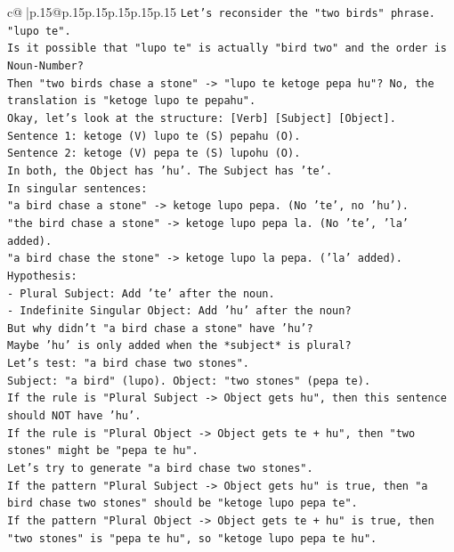\documentclass{article}
\begin{document}
{\begin{supertabular}{c@{$\;$}|p{.15\linewidth}@{}p{.15\linewidth}p{.15\linewidth}p{.15\linewidth}p{.15\linewidth}p{.15\linewidth}}
{{{\texttt{Let's reconsider the "two birds" phrase. "lupo te".} \\
\texttt{Is it possible that "lupo te" is actually "bird two" and the order is Noun{-}Number?} \\
\texttt{Then "two birds chase a stone" {-}> "lupo te ketoge pepa hu"? No, the translation is "ketoge lupo te pepahu".} \\
\texttt{Okay, let's look at the structure: {[}Verb{]} {[}Subject{]} {[}Object{]}.} \\
\texttt{Sentence 1: ketoge (V) lupo te (S) pepahu (O).} \\
\texttt{Sentence 2: ketoge (V) pepa te (S) lupohu (O).} \\
\texttt{In both, the Object has 'hu'. The Subject has 'te'.} \\
\texttt{In singular sentences:} \\
\texttt{"a bird chase a stone" {-}> ketoge lupo pepa. (No 'te', no 'hu').} \\
\texttt{"the bird chase a stone" {-}> ketoge lupo pepa la. (No 'te', 'la' added).} \\
\texttt{"a bird chase the stone" {-}> ketoge lupo la pepa. ('la' added).} \\
\texttt{Hypothesis:} \\
\texttt{{-} Plural Subject: Add 'te' after the noun.} \\
\texttt{{-} Indefinite Singular Object: Add 'hu' after the noun?} \\
\texttt{But why didn't "a bird chase a stone" have 'hu'?} \\
\texttt{Maybe 'hu' is only added when the *subject* is plural?} \\
\texttt{Let's test: "a bird chase two stones".} \\
\texttt{Subject: "a bird" (lupo). Object: "two stones" (pepa te).} \\
\texttt{If the rule is "Plural Subject {-}> Object gets hu", then this sentence should NOT have 'hu'.} \\
\texttt{If the rule is "Plural Object {-}> Object gets te + hu", then "two stones" might be "pepa te hu".} \\
\texttt{Let's try to generate "a bird chase two stones".} \\
\texttt{If the pattern "Plural Subject {-}> Object gets hu" is true, then "a bird chase two stones" should be "ketoge lupo pepa te".} \\
\texttt{If the pattern "Plural Object {-}> Object gets te + hu" is true, then "two stones" is "pepa te hu", so "ketoge lupo pepa te hu".} \\
}}}
\end{supertabular}}
\end{document}
